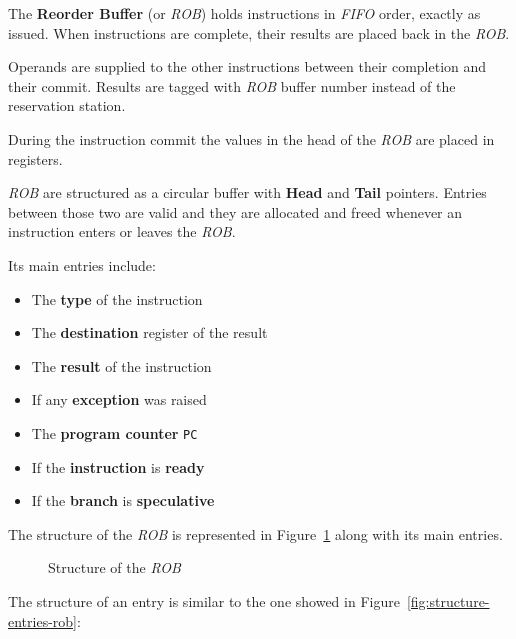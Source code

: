 \documentclass[english]{article}
\begin{document}
The \textbf{Reorder Buffer} (or \textit{ROB}) holds instructions in \textit{FIFO} order, exactly as issued.
When instructions are complete, their results are placed back in the \textit{ROB}.

Operands are supplied to the other instructions between their completion and their commit.
Results are tagged with \textit{ROB} buffer number instead of the reservation station.

During the instruction commit the values in the head of the \textit{ROB} are placed in registers.

\bigskip
\textit{ROB} are structured as a circular buffer with \textbf{Head} and \textbf{Tail} pointers.
Entries between those two are valid and they are allocated and freed whenever an instruction enters or leaves the \textit{ROB}.

Its main entries include:

\begin{itemize}
  \item The \textbf{type} of the instruction
  \item The \textbf{destination} register of the result
  \item The \textbf{result} of the instruction
  \item If any \textbf{exception} was raised
  \item The \textbf{program counter} \texttt{PC}
  \item If the \textbf{instruction} is \textbf{ready}
  \item If the \textbf{branch} is \textbf{speculative}
\end{itemize}

\bigskip
The structure of the \textit{ROB} is represented in Figure~\ref{fig:structure-of-ROB} along with its main entries.

\begin{figure}[htpb]
  \bigskip
  \centering
  \caption{Structure of the \textit{ROB}}
  \label{fig:structure-of-ROB}
  \bigskip
\end{figure}

The structure of an entry is similar to the one showed in Figure~\ref{fig:structure-entries-rob}:
\end{document}
